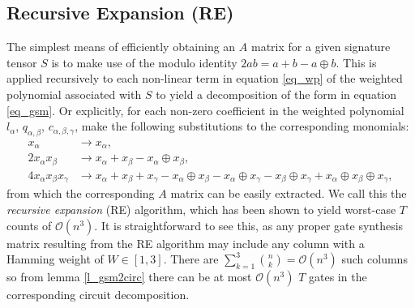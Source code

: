\documentclass[notitlepage]{article}
\theoremstyle{definition}
\theoremstyle{problem}
\theoremstyle{lemma}
\begin{document}
\subsection{Recursive Expansion (RE)}
The simplest means of efficiently obtaining an $A$ matrix for a given signature tensor $S$ is to make use of the modulo identity $2ab = a + b - a\oplus b$. This is applied recursively to each non-linear term in equation \ref{eq_wp} of the weighted polynomial  associated with $S$ to yield a decomposition of the form in equation \ref{eq_gsm}. Or explicitly, for each non-zero coefficient in the weighted polynomial $l_\alpha$, $q_{\alpha,\beta}$, $c_{\alpha,\beta,\gamma}$, make the following substitutions to the corresponding monomials:
\begin{align}
x_\alpha &\rightarrow x_\alpha, \\
2x_\alpha x_\beta &\rightarrow x_\alpha + x_\beta - x_\alpha \oplus x_\beta, \\
4x_\alpha x_\beta x_\gamma &\rightarrow
x_\alpha + x_\beta  + x_\gamma - x_\alpha \oplus x_\beta - x_\alpha\oplus x_\gamma - x_\beta\oplus x_\gamma + x_\alpha \oplus x_\beta\oplus x_\gamma,
\end{align}
from which the corresponding $A$ matrix can be easily extracted.
We call this the \emph{recursive expansion} (RE) algorithm, which has been shown to yield worst-case $T$ counts of $\mathcal{O}(n^3)$. It is straightforward to see this, as any proper gate synthesis matrix resulting from the RE algorithm may include any column with a Hamming weight of $W\in[1,3]$. There are $\sum_{k=1}^3{{n}\choose{k}}=\mathcal{O}(n^3)$ such columns so from lemma \ref{l_gsm2circ} there can be at most $\mathcal{O}(n^3)$ $T$ gates in the corresponding circuit decomposition.
\end{document}
